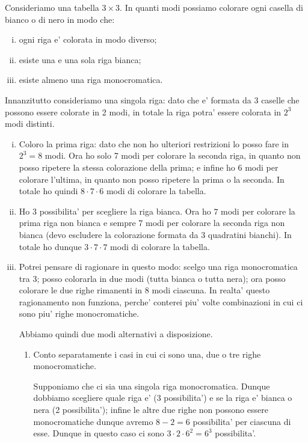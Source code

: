 \begin{example}
    Consideriamo una tabella $3 \times 3$. In quanti modi possiamo colorare ogni casella di bianco o di nero in modo che:
    \begin{enumerate}[(i)]
        \item ogni riga e' colorata in modo diverso;
        \item esiste una e una sola riga bianca;
        \item esiste almeno una riga monocromatica.
    \end{enumerate}
\end{example}
\begin{solution}
    Innanzitutto consideriamo una singola riga: dato che e' formata da $3$ caselle che possono essere colorate in 2 modi, in totale la riga potra' essere colorata in $2^3$ modi distinti.
    \begin{enumerate}
        [(i)]
        \item Coloro la prima riga: dato che non ho ulteriori restrizioni lo posso fare in $2^3 = 8$ modi. Ora ho solo 7 modi per colorare la seconda riga, in quanto non posso ripetere la stessa colorazione della prima; e infine ho 6 modi per colorare l'ultima, in quanto non posso ripetere la prima o la seconda. In totale ho quindi $8\cdot 7\cdot 6$ modi di colorare la tabella.
        \item Ho $3$ possibilita' per scegliere la riga bianca. Ora ho $7$ modi per colorare la prima riga non bianca e sempre 7 modi per colorare la seconda riga non bianca (devo escludere la colorazione formata da 3 quadratini bianchi). In totale ho dunque $3 \cdot 7\cdot 7$ modi di colorare la tabella.
        \item Potrei pensare di ragionare in questo modo: scelgo una riga monocromatica tra 3; posso colorarla in due modi (tutta bianca o tutta nera); ora posso colorare le due righe rimanenti in 8 modi ciascuna. In realta' questo ragionamento non funziona, perche' conterei piu' volte combinazioni in cui ci sono piu' righe monocromatiche.
        
        Abbiamo quindi due modi alternativi a disposizione. \begin{enumerate}[1.]
            \item Conto separatamente i casi in cui ci sono una, due o tre righe monocromatiche.
            
            Supponiamo che ci sia una singola riga monocromatica. Dunque dobbiamo scegliere quale riga e' (3 possibilita') e se la riga e' bianca o nera (2 possibilita'); infine le altre due righe non possono essere monocromatiche dunque avremo $8-2 = 6$ possibilita' per ciascuna di esse. Dunque in questo caso ci sono $3\cdot 2 \cdot 6^2 = 6^3$ possibilita'.


\end{enumerate}
\end{enumerate}
\end{solution}
